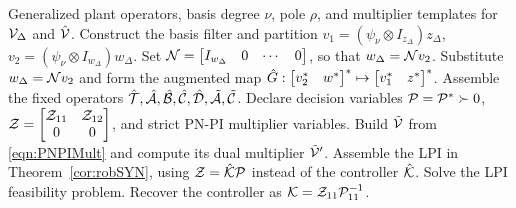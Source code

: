 \begin{algorithm}[t]
	\caption{Programming the Dual Synthesis LPI}
	\label{alg:program_dual_lpi}
	\begin{algorithmic}[1]
		\Require Generalized plant operators, basis degree \(\nu\), pole \(\rho\),
		and multiplier templates for \(\mathcal{V}_\Delta\) and \(\hat{\mathcal{V}}\).
		\State Construct the basis filter and partition
		\(v_1=(\psi_\nu\otimes I_{z_\Delta})z_\Delta\),
		\(v_2=(\psi_\nu\otimes I_{w_\Delta})w_\Delta\).
		\State Set \(\mathcal{N}=\begin{bmatrix}I_{w_\Delta}&0&\cdots&0\end{bmatrix}\), so that
		\(w_\Delta=\mathcal{N} v_2\).
		\State Substitute \(w_\Delta=\mathcal{N} v_2\) and form the augmented map
		\(\hat G:\begin{bmatrix}v_2^*&w^*\end{bmatrix}^*\mapsto\begin{bmatrix}v_1^*&z^*\end{bmatrix}^*\).
		\State Assemble the fixed operators
		\(\hat{\mathcal{T}},\hat{\mathcal{A}},\hat{\mathcal{B}},\hat{\mathcal{C}},\hat{\mathcal{D}},
		\tilde{\mathcal{A}},\tilde{\mathcal{C}}\).
		\State Declare decision variables \(\mathcal{P}=\mathcal{P}^*\succ0\),
		\(\mathcal{Z}=\begin{bmatrix}\mathcal{Z}_{11}&\mathcal{Z}_{12}\\0&0\end{bmatrix}\), and strict PN-PI
		multiplier variables.
		\State Build \(\tilde{\mathcal{V}}\) from \eqref{eqn:PNPIMult} and compute its
		dual multiplier \(\tilde{\mathcal{V}}'\).
		\State Assemble the LPI in Theorem~\ref{cor:robSYN}, using
		\(\mathcal{Z}=\hat{\mathcal{K}}\mathcal{P}\) instead of the controller
		\(\hat{\mathcal{K}}\).
		\State Solve the LPI feasibility problem.
		\State Recover the controller as
		\(\mathcal{K}=\mathcal{Z}_{11}\mathcal{P}_{11}^{-1}\).
	\end{algorithmic}
\end{algorithm}

